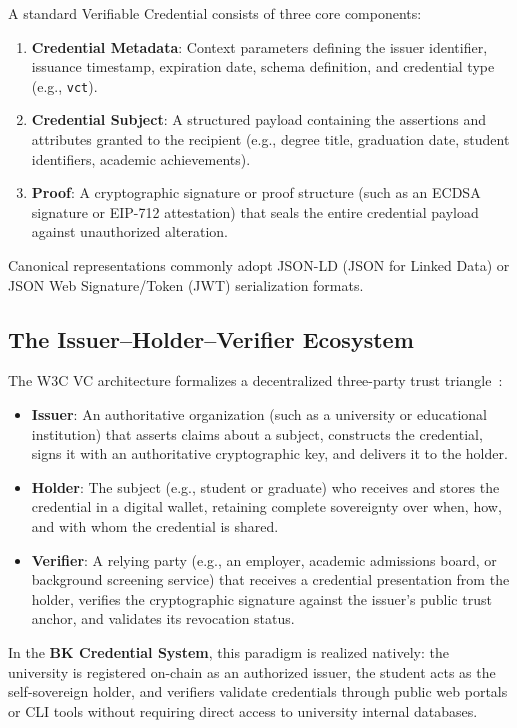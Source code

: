 A standard Verifiable Credential consists of three core components:
\begin{enumerate}
    \item \textbf{Credential Metadata}: Context parameters defining the issuer identifier, issuance timestamp, expiration date, schema definition, and credential type (e.g., \texttt{vct}).
    \item \textbf{Credential Subject}: A structured payload containing the assertions and attributes granted to the recipient (e.g., degree title, graduation date, student identifiers, academic achievements).
    \item \textbf{Proof}: A cryptographic signature or proof structure (such as an ECDSA signature or EIP-712 attestation) that seals the entire credential payload against unauthorized alteration.
\end{enumerate}

Canonical representations commonly adopt JSON-LD (JSON for Linked Data) or JSON Web Signature/Token (JWT) serialization formats.

\subsection{The Issuer--Holder--Verifier Ecosystem}

The W3C VC architecture formalizes a decentralized three-party trust triangle~\cite{W3CVC}:
\begin{itemize}
    \item \textbf{Issuer}: An authoritative organization (such as a university or educational institution) that asserts claims about a subject, constructs the credential, signs it with an authoritative cryptographic key, and delivers it to the holder.
    \item \textbf{Holder}: The subject (e.g., student or graduate) who receives and stores the credential in a digital wallet, retaining complete sovereignty over when, how, and with whom the credential is shared.
    \item \textbf{Verifier}: A relying party (e.g., an employer, academic admissions board, or background screening service) that receives a credential presentation from the holder, verifies the cryptographic signature against the issuer's public trust anchor, and validates its revocation status.
\end{itemize}

In the \textbf{BK Credential System}, this paradigm is realized natively: the university is registered on-chain as an authorized issuer, the student acts as the self-sovereign holder, and verifiers validate credentials through public web portals or CLI tools without requiring direct access to university internal databases.

